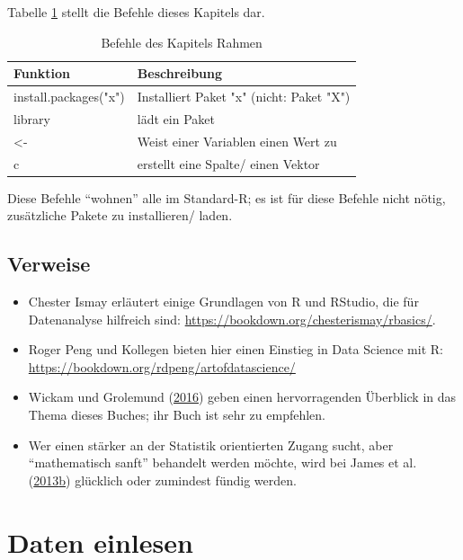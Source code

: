 \documentclass[12pt,ngerman,]{book}
\begin{document}
Tabelle \ref{tab:befehle-rahmen} stellt die Befehle dieses Kapitels dar.

\begin{table}

\caption{\label{tab:befehle-rahmen}Befehle des Kapitels Rahmen}
\centering
\begin{tabular}[t]{l|l}
\hline
Funktion & Beschreibung\\
\hline
install.packages("x") & Installiert Paket "x" (nicht: Paket "X")\\
\hline
library & lädt ein Paket\\
\hline
<- & Weist einer Variablen einen Wert zu\\
\hline
c & erstellt eine Spalte/ einen Vektor\\
\hline
\end{tabular}
\end{table}

Diese Befehle ``wohnen'' alle im Standard-R; es ist für diese Befehle
nicht nötig, zusätzliche Pakete zu installieren/ laden.

\section{Verweise}\label{verweise}

\begin{itemize}
\item
  Chester Ismay erläutert einige Grundlagen von R und RStudio, die für
  Datenanalyse hilfreich sind:
  \url{https://bookdown.org/chesterismay/rbasics/}.
\item
  Roger Peng und Kollegen bieten hier einen Einstieg in Data Science mit
  R: \url{https://bookdown.org/rdpeng/artofdatascience/}
\item
  Wickam und Grolemund (\protect\hyperlink{ref-r4ds}{2016}) geben einen
  hervorragenden Überblick in das Thema dieses Buches; ihr Buch ist sehr
  zu empfehlen.
\item
  Wer einen stärker an der Statistik orientierten Zugang sucht, aber
  ``mathematisch sanft'' behandelt werden möchte, wird bei James et al.
  (\protect\hyperlink{ref-introstatlearning}{2013}\protect\hyperlink{ref-introstatlearning}{b})
  glücklich oder zumindest fündig werden.
\end{itemize}

\chapter{Daten einlesen}\label{daten-einlesen}
\end{document}
